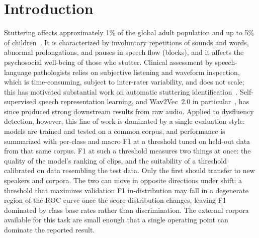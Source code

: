 \documentclass[a4paper,orivec]{llncs}
\begin{document}
\section{Introduction}
\label{sec:intro}
Stuttering affects approximately 1\% of the global adult population and up to
5\% of children~\cite{yairi2009childhood}. It is characterized by involuntary
repetitions of sounds and words, abnormal prolongations, and pauses in speech
flow (blocks), and it affects the psychosocial well-being of those who stutter.
Clinical assessment by speech-language pathologists relies on subjective listening
and waveform inspection, which is time-consuming, subject to inter-rater
variability, and does not scale; this has motivated substantial work on automatic
stuttering identification~\cite{sheikh2022review}. Self-supervised speech
representation learning, and Wav2Vec~2.0 in particular~\cite{baevski2020wav2vec},
has since produced strong downstream results from raw audio. Applied to dysfluency
detection, however, this line of work is dominated by a single evaluation style:
models are trained and tested on a common corpus, and performance is summarized
with per-class and macro F1 at a threshold tuned on held-out data from that same
corpus. F1 at such a threshold measures two things at once: the quality of the
model's ranking of clips, and the suitability of a threshold calibrated on data
resembling the test data. Only the first should transfer to new speakers and
corpora. The two can move in opposite directions under shift: a threshold that
maximizes validation F1 in-distribution may fall in a degenerate region of the ROC
curve once the score distribution changes, leaving F1 dominated by class base
rates rather than discrimination. The external corpora available for this task are
small enough that a single operating point can dominate the reported result.
\end{document}
